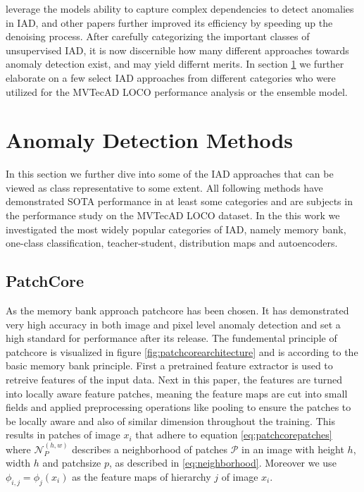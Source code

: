 leverage the models ability to capture complex dependencies to detect anomalies in IAD, and other papers \cite{zhang2023diffusionaddiffusionmodern} further improved its efficiency by speeding up 
the denoising process.
\newline
After carefully categorizing the important classes of unsupervised IAD, it is now discernible how many different approaches towards anomaly detection exist, and may yield differnt merits. 
In section \ref{sec:IADmethods} we further elaborate on a few select IAD approaches from different categories who were utilized for the MVTecAD LOCO performance analysis or the ensemble 
model. 


\section{Anomaly Detection Methods}
\label{sec:IADmethods}
In this section we further dive into some of the IAD approaches that can be viewed as class representative to some extent. All following methods have demonstrated SOTA performance in 
at least some categories and are subjects in the performance study on the MVTecAD LOCO dataset. In the this work we investigated the most widely popular categories of 
IAD, namely memory bank, one-class classification, teacher-student, distribution maps and autoencoders.%

\subsection{PatchCore}
\label{subsec:patchcore}
As the memory bank approach patchcore \cite{patchCore2022} has been chosen. It has demonstrated very high accuracy in both image and pixel level anomaly detection and set a high standard for 
performance after its release. The fundemental principle of patchcore is visualized in figure \ref{fig:patchcorearchitecture} and is according to the basic memory bank principle. First a pretrained feature extractor is used 
to retreive features of the input data. Next in this paper, the features are turned into locally aware feature patches, meaning the feature maps are cut into small fields and applied preprocessing operations like pooling to ensure 
the patches to be locally aware and also of similar dimension throughout the training. This results in patches of image $x_i$ that adhere to equation \ref{eq:patchcorepatches} where $\mathcal{N}_{P}^{(h,w)}$ 
describes a neighborhood of patches $\mathcal{P}$ in an image with height $h$, width $h$ and patchsize $p$, as described in \ref{eq:neighborhood}. Moreover we use $\phi_{i,j} = \phi_j(x_i)$ as the feature 
maps of hierarchy $j$ of image $x_i$.

